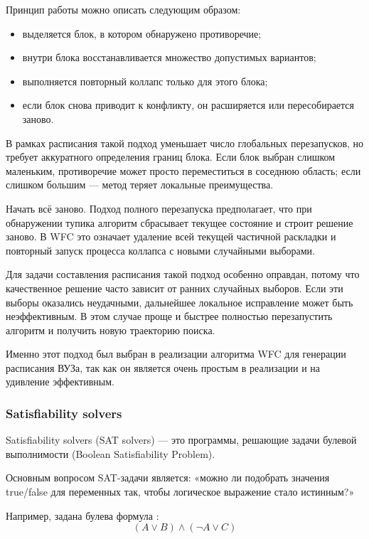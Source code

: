  Принцип работы можно описать следующим образом:
 \begin{itemize}
 	\item выделяется блок, в котором обнаружено противоречие;
 	\item внутри блока восстанавливается множество допустимых вариантов;
 	\item выполняется повторный коллапс только для этого блока;
 	\item если блок снова приводит к конфликту, он расширяется или пересобирается заново.
 \end{itemize}

 В рамках расписания такой подход уменьшает число глобальных перезапусков, но требует аккуратного определения границ блока.
 Если блок выбран слишком маленьким, противоречие может просто переместиться в соседнюю область; если слишком большим --- метод теряет локальные преимущества.

 Начать всё заново. Подход полного перезапуска предполагает, что при обнаружении тупика алгоритм сбрасывает текущее состояние и строит решение заново.
 В WFC это означает удаление всей текущей частичной раскладки и повторный запуск процесса коллапса с новыми случайными выборами.

 Для задачи составления расписания такой подход особенно оправдан, потому что качественное решение часто зависит от ранних случайных выборов.
 Если эти выборы оказались неудачными, дальнейшее локальное исправление может быть неэффективным.
 В этом случае проще и быстрее полностью перезапустить алгоритм и получить новую траекторию поиска.

Именно этот подход был выбран в реализации алгоритма WFC для генерации расписания ВУЗа, так как он является очень простым в реализации и на удивление эффективным.

 \subsubsection{Satisfiability solvers}

 Satisfiability solvers (SAT solvers) --- это программы, решающие задачи булевой выполнимости
 (Boolean Satisfiability Problem).

 Основным вопросом SAT-задачи является: «можно ли подобрать значения true/false для переменных так, чтобы логическое выражение стало истинным?»

 Например, задана булева формула :
 \begin{equation}
 	(A \lor B) \land (\neg A \lor C)
 	\label{eq:sat-formula}
 \end{equation}

